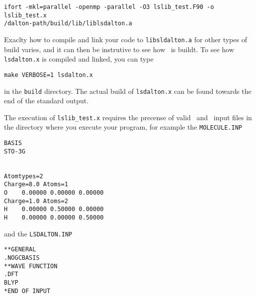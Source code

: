 \begin{verbatim}
ifort -mkl=parallel -openmp -parallel -O3 lslib_test.F90 -o lslib_test.x 
/dalton-path/build/lib/liblsdalton.a
\end{verbatim}
%
Exaclty how to compile and link your code to \verb|libsldalton.a| for other types of build 
varies, and it can then be instrutive to see how \lsdalton\ is buildt. To see how 
\verb|lsdalton.x| is compiled and linked, you can type

\begin{verbatim}
make VERBOSE=1 lsdalton.x
\end{verbatim}
%
in the \verb|build| directory. The actual build of \verb|lsdalton.x| can be found towards
the end of the standard output. 

The execution of \verb|lslib_test.x| requires the precense of  valid \molecule\ and \lsdalton\ input 
files in the directory where you execute your program, for example the \verb|MOLECULE.INP|

\begin{verbatim}
BASIS
STO-3G


Atomtypes=2 
Charge=8.0 Atoms=1
O    0.00000 0.00000 0.00000
Charge=1.0 Atoms=2
H    0.00000 0.50000 0.00000
H    0.00000 0.00000 0.50000
\end{verbatim}
%
and the \verb|LSDALTON.INP|

\begin{verbatim}
**GENERAL
.NOGCBASIS
**WAVE FUNCTION
.DFT
BLYP
*END OF INPUT
\end{verbatim}









